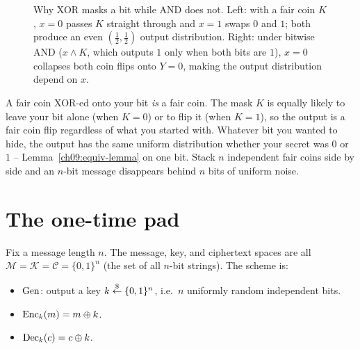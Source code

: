 \begin{figure}[htbp]
\caption{Why XOR masks a bit while AND does not. Left: with a fair coin $K$, $x = 0$ passes $K$ straight through and $x = 1$ swaps $0$ and $1$; both produce an even $(\tfrac12, \tfrac12)$ output distribution. Right: under bitwise AND ($x \land K$, which outputs $1$ only when both bits are $1$), $x = 0$ collapses both coin flips onto $Y = 0$, making the output distribution depend on $x$.}
\label{ch09:fig-xor-masking}
\end{figure}

\begin{intuitionbox}
A fair coin XOR-ed onto your bit \emph{is} a fair coin. The mask $K$ is equally likely to leave your bit alone (when $K=0$) or to flip it (when $K=1$), so the output is a fair coin flip regardless of what you started with. Whatever bit you wanted to hide, the output has the same uniform distribution whether your secret was $0$ or $1$ -- Lemma~\ref{ch09:equiv-lemma} on one bit. Stack $n$ independent fair coins side by side and an $n$-bit message disappears behind $n$ bits of uniform noise.
\end{intuitionbox}

\section{The one-time pad}
\label{ch09:otp}

\begin{definition}
\label{ch09:otp-def}
Fix a message length $n$. The message, key, and ciphertext spaces are all $\mathcal{M} = \mathcal{K} = \mathcal{C} = \{0,1\}^n$ (the set of all $n$-bit strings). The scheme is:
\begin{itemize}
  \item $\operatorname{Gen}$: output a key $k \stackrel{\$}{\gets} \{0,1\}^n$, i.e.\ $n$ uniformly random independent bits.
  \item $\operatorname{Enc}_k(m) = m \oplus k$.
  \item $\operatorname{Dec}_k(c) = c \oplus k$.
\end{itemize}
\end{definition}

